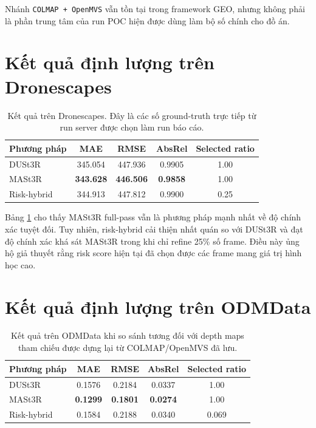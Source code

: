 \documentclass[12pt,a4paper,oneside]{report}
\begin{document}
Nhánh \texttt{COLMAP + OpenMVS} vẫn tồn tại trong framework GEO, nhưng không phải là phần trung tâm của run POC hiện được dùng làm bộ số chính cho đồ án.

\section{Kết quả định lượng trên Dronescapes}

\begin{table}[t]
\centering
\small
\begin{tabular}{lcccc}
\toprule
\textbf{Phương pháp} & \textbf{MAE} & \textbf{RMSE} & \textbf{AbsRel} & \textbf{Selected ratio} \\
\midrule
DUSt3R & 345.054 & 447.936 & 0.9905 & 1.00 \\
MASt3R & \textbf{343.628} & \textbf{446.506} & \textbf{0.9858} & 1.00 \\
Risk-hybrid & 344.913 & 447.812 & 0.9900 & 0.25 \\
\bottomrule
\end{tabular}
\caption{Kết quả trên Dronescapes. Đây là các số ground-truth trực tiếp từ run server được chọn làm run báo cáo.}
\label{tab:dronescapes-thesis}
\end{table}

Bảng \ref{tab:dronescapes-thesis} cho thấy MASt3R full-pass vẫn là phương pháp mạnh nhất về độ chính xác tuyệt đối. Tuy nhiên, risk-hybrid cải thiện nhất quán so với DUSt3R và đạt độ chính xác khá sát MASt3R trong khi chỉ refine 25\% số frame. Điều này ủng hộ giả thuyết rằng risk score hiện tại đã chọn được các frame mang giá trị hình học cao.

\section{Kết quả định lượng trên ODMData}

\begin{table}[t]
\centering
\small
\begin{tabular}{lcccc}
\toprule
\textbf{Phương pháp} & \textbf{MAE} & \textbf{RMSE} & \textbf{AbsRel} & \textbf{Selected ratio} \\
\midrule
DUSt3R & 0.1576 & 0.2184 & 0.0337 & 1.00 \\
MASt3R & \textbf{0.1299} & \textbf{0.1801} & \textbf{0.0274} & 1.00 \\
Risk-hybrid & 0.1584 & 0.2188 & 0.0340 & 0.069 \\
\bottomrule
\end{tabular}
\caption{Kết quả trên ODMData khi so sánh tương đối với depth maps tham chiếu được dựng lại từ COLMAP/OpenMVS đã lưu.}
\label{tab:odm-thesis}
\end{table}
\end{document}
